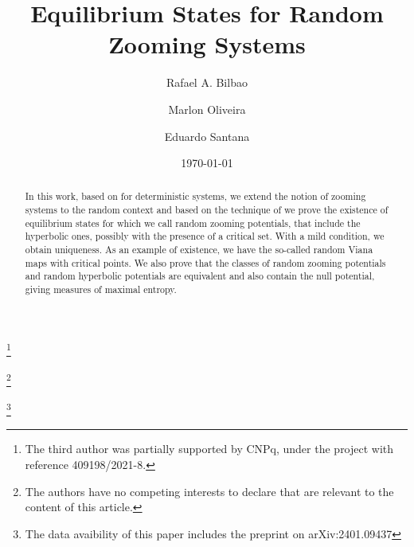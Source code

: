 \documentclass[12pt,a4paper]{amsart}
\theoremstyle{plain}
\begin{document}
	
	\title[Equilibrium States for Random Zooming Systems]{Equilibrium States for Random Zooming Systems}
	
	
	\author[R. A. Bilbao]{Rafael A. Bilbao}
	\address{Rafael A. Bilbao, Universidad Pedag\'ogica y Tecnol\'ogica de Colombia, Avenida
		Central del Norte 39-115, Sede Central Tunja, Boyac\'a, 150003, Colombia. 
	}
	\author[M. Oliveira]{Marlon Oliveira}
	\address{Marlon Oliveira, Departamento de Matem\'atica e Inform\'atica, Universidade Estadual do Maranh\~ao,  65055-310  S\~ao Lu\'is, Brazil} 
	
	\author[E. Santana]{Eduardo Santana}
	\address{Eduardo Santana, Universidade Federal de Alagoas, 57200-000 Penedo, Brazil}
	
	
	\thanks{The third author was partially supported by CNPq,   under the project with reference 409198/2021-8.} 
	
	\thanks{The authors have no competing interests to declare that are relevant to the content of this article.}
	
	\thanks{The data avaibility of this paper includes the preprint on arXiv:2401.09437}
	
	
	\date{\today}
	
	
	
	
	
	\maketitle
	
	\begin{abstract} 
		In this work, based on \cite{Pi1} for deterministic systems, we extend the notion of zooming systems to the random context and based on the technique of \cite{AMO} we prove the existence of equilibrium states for which we call random zooming potentials, that include the hyperbolic ones, possibly with the presence of a critical set. With a mild condition, we obtain uniqueness. As an example of existence, we have the so-called random Viana maps with critical points. We also prove that the classes of random zooming potentials and random hyperbolic potentials are equivalent and also contain the null potential, giving measures of maximal entropy.
	\end{abstract}
	
	
	\bigskip
	
\end{document}
